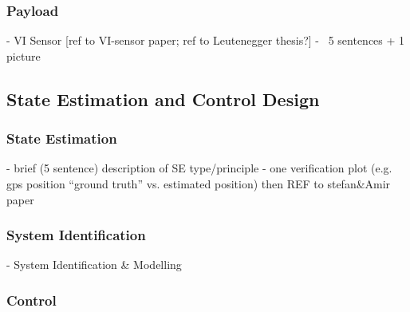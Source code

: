 \subsubsection{Payload}
  - VI Sensor [ref to VI-sensor paper; ref to Leutenegger thesis?]
  - ~5 sentences + 1 picture
  
\subsection{State Estimation and Control Design}

\subsubsection{State Estimation} \label{secsec:StateEstimation}
  - brief (5 sentence) description of SE type/principle
  - one verification plot (e.g. gps position ``ground truth'' vs. estimated position) 
  then REF to stefan\&Amir paper
  
\subsubsection{System Identification} \label{sec:SystemID}
 - System Identification \& Modelling
 
 
 
 \subsubsection{Control}

